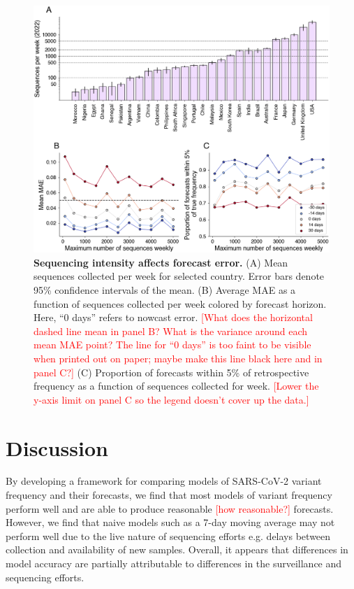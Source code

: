 \documentclass[11pt,oneside,letterpaper]{article}
\def\jhc#1{\textcolor{red}{[#1]}}
\begin{document}
\begin{figure}[H]
    \centering
    \includegraphics[width=0.8\linewidth]{figures/downscaling_sequencing.png}
    \caption{\textbf{Sequencing intensity affects forecast error.}
    (A) Mean sequences collected per week for selected country. Error bars denote 95\% confidence intervals of the mean.
    (B) Average MAE as a function of sequences collected per week colored by forecast horizon. Here, ``0 days'' refers to nowcast error.
    \jhc{What does the horizontal dashed line mean in panel B? What is the variance around each mean MAE point? The line for ``0 days'' is too faint to be visible when printed out on paper; maybe make this line black here and in panel C?}
    (C) Proportion of forecasts within 5\% of retrospective frequency as a function of sequences collected for week.
    \jhc{Lower the y-axis limit on panel C so the legend doesn't cover up the data.}
  }%
    \label{fig:downscaling}
\end{figure}

\section*{Discussion}




By developing a framework for comparing models of SARS-CoV-2 variant frequency and their forecasts, we find that most models of variant frequency perform well and are able to produce reasonable \jhc{how reasonable?} forecasts.
However, we find that naive models such as a 7-day moving average may not perform well due to the live nature of sequencing efforts e.g. delays between collection and availability of new samples.
Overall, it appears that differences in model accuracy are partially attributable to differences in the surveillance and sequencing efforts.
\end{document}
